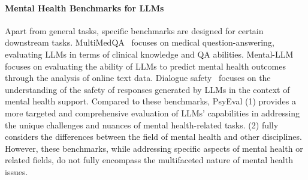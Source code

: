 \paragraph*{Mental Health Benchmarks for LLMs}
Apart from general tasks, specific benchmarks are designed for certain downstream tasks. MultiMedQA~\cite{singhal2023large} focuses on medical question-answering, evaluating LLMs in terms of clinical knowledge and QA abilities. Mental-LLM~\cite{xu2023leveraging} focuses on evaluating the ability of LLMs to predict mental health outcomes through the analysis of online text data. Dialogue safety~\cite{qiu2023benchmark} focuses on the understanding of the safety of responses generated by LLMs in the context of mental health support. Compared to these benchmarks, PsyEval (1) provides a more targeted and comprehensive evaluation of LLMs' capabilities in addressing the unique challenges and nuances of mental health-related tasks. (2) fully considers the differences between the field of mental health and other disciplines.
However, these benchmarks, while addressing specific aspects of mental health or related fields, do not fully encompass the multifaceted nature of mental health issues.

